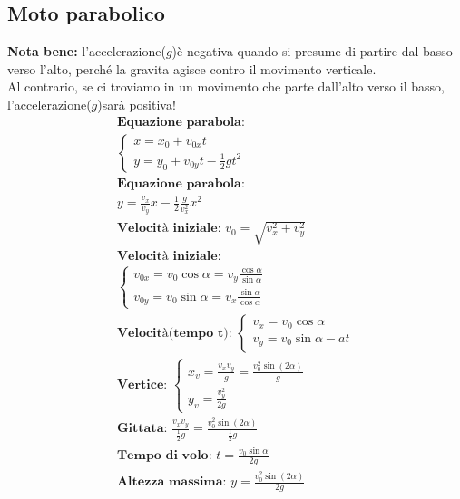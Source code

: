 \subsection{Moto parabolico}
\textbf{Nota bene: } l'accelerazione($g$)è negativa quando si presume di partire dal basso verso l'alto, perché la gravita agisce contro il movimento verticale. \\ Al contrario, se ci troviamo in un movimento che parte dall'alto verso il basso, l'accelerazione($g$)sarà positiva!
\begin{gather*}
\textbf{Equazione parabola: } \\ \begin{cases}
    x = x_0 + v_{0x} t \\
    y = y_0 + v_{0y} t - \frac{1}{2} g t^2
\end{cases}
\\
\textbf{Equazione parabola: } \\ y = \frac{v_x}{v_y} x - \frac{1}{2} \frac{g}{v_x^2} x^2 \\
\textbf{Velocità iniziale: } v_0 = \sqrt{v_x^2 + v_y^2} \\
\textbf{Velocità iniziale: } \\ \begin{cases}
    v_{0x} = v_0 \cos \alpha  = v_y \frac{\cos \alpha}{\sin \alpha} \\
    v_{0y} = v_0 \sin \alpha = v_x \frac{\sin \alpha }{\cos \alpha}
\end{cases}
\\
\textbf{Velocità(tempo t): } \begin{cases}
    v_x = v_0 \cos \alpha \\
    v_y = v_0 \sin \alpha - a t
\end{cases}
\\
\textbf{Vertice: } \begin{cases}
    x_v = \frac{v_x v_y}{g} = \frac{v_0^2 \sin (2\alpha)}{g} \\
    y_v = \frac{v_y^2}{2g}
\end{cases}
\\
\textbf{Gittata: } \frac{v_x v_y}{\frac{1}{2}g} = \frac{v_0^2 \sin (2 \alpha)}{\frac{1}{2}g} \\
\textbf{Tempo di volo: } t = \frac{v_0 \sin \alpha}{2g} \\
\textbf{Altezza massima: } y = \frac{v_0^2 \sin (2 \alpha)}{2g}
\end{gather*}

